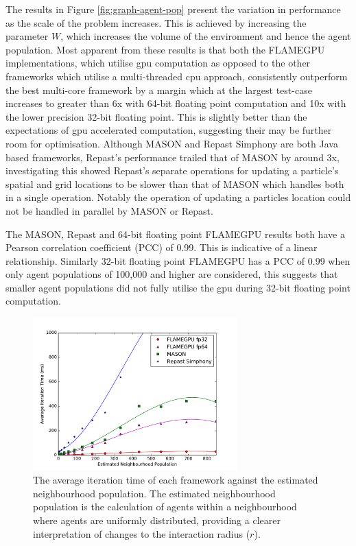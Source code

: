   The results in Figure \ref{fig:graph-agent-pop} present the variation in performance as the scale of the problem increases. This is achieved by increasing the parameter $W$, which increases the volume of the environment and hence the agent population. Most apparent from these results is that both the FLAMEGPU implementations, which utilise \gls{gpu} computation as opposed to the other frameworks which utilise a multi-threaded \gls{cpu} approach, consistently outperform the best multi-core framework by a margin which at the largest test-case increases to greater than 6x with 64-bit floating point computation and 10x with the lower precision 32-bit floating point. This is slightly better than the expectations of \gls{gpu} accelerated computation\cite{LK*10}, suggesting their may be further room for optimisation. Although MASON and Repast Simphony are both Java based frameworks, Repast's performance trailed that of MASON by around 3x, investigating this showed Repast's separate operations for updating a particle's spatial and grid locations to be slower than that of MASON which handles both in a single operation. Notably the operation of updating a particles location could not be handled in parallel by MASON or Repast.
  
  The MASON, Repast and 64-bit floating point FLAMEGPU results both have a Pearson correlation coefficient (PCC) \cite{PCC} of 0.99. This is indicative of a linear relationship. Similarly 32-bit floating point FLAMEGPU has a PCC of 0.99 when only agent populations of 100,000 and higher are considered, this suggests that smaller agent populations did not fully utilise the \gls{gpu} during 32-bit floating point computation.
  
  \begin{figure}[tb]
\begin{center}
    \includegraphics[width=0.7\textwidth]{../resources/neighbourscale_graph/graph.pdf}
    \caption{\label{fig:graph-neighbourhood-pop}The average iteration time of each framework against the estimated neighbourhood population. The estimated neighbourhood population is the calculation of agents within a neighbourhood where agents are uniformly distributed, providing a clearer interpretation of changes to the interaction radius ($r$). }
\end{center}
\end{figure}
  
